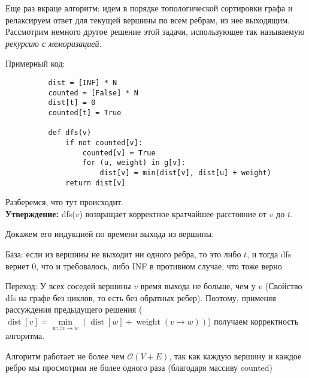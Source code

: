 \documentclass[a4paper,12pt]{article}
\begin{document}
      Еще раз вкраце алгоритм: идем в порядке топологической сортировки графа
      и релаксируем ответ для текущей вершины по всем ребрам, из нее выходящим.
      \\
      
      Рассмотрим немного другое решение этой задачи, использующее так 
      называемую \emph{рекурсию с меморизацией}. 
      
      Примерный код:
      
      \begin{lstlisting}
          dist = [INF] * N
          counted = [False] * N
          dist[t] = 0
          counted[t] = True
          
          def dfs(v)
              if not counted[v]:
                  counted[v] = True
                  for (u, weight) in g[v]:
                      dist[v] = min(dist[v], dist[u] + weight)
              return dist[v]
      \end{lstlisting}
      
      Разберемся, что тут происходит.
      \\
      
      \textbf{Утверждение:} dfs($v$) возвращает корректное кратчайшее 
      расстояние от $v$ до $t$.
      
      Докажем его индукцией по времени выхода из вершины.
      
      База: если из вершины не выходит ни одного ребра, то это либо $t$, 
      и тогда dfs вернет $0$, что и требовалось, либо INF в противном случае,
      что тоже верно
      
      Переход: У всех соседей вершины $v$ время выхода не больше, чем у $v$
      (Свойство dfs на графе без циклов, то есть без обратных ребер). Поэтому, 
      применяя рассуждения предыдущего решения
      ($\operatorname{dist}[v] = \min\limits_{w: \exists v \rightarrow w}
      (\operatorname{dist}[w] + \operatorname{weight}(v \rightarrow w))$)
	  получаем корректность алгоритма.
	  
	  Алгоритм работает не более чем $\mathcal{O}(V + E)$, так как каждую вершину и
	  каждое ребро мы просмотрим не более одного раза (благодаря массиву counted)
	  
\end{document}
